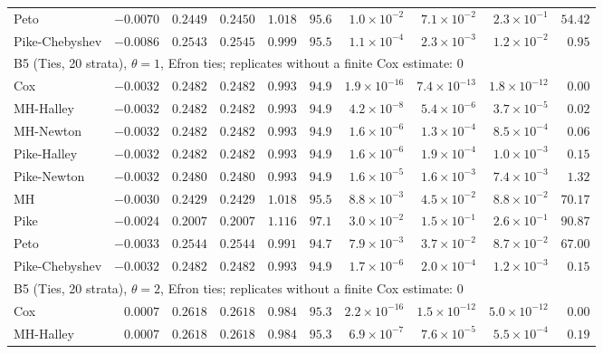 \begin{landscape}
\begin{longtable}{lrrrrrrrrr}
Peto & $-0.0070$ & $0.2449$ & $0.2450$ & $1.018$ & $95.6$ & $1.0 \times 10^{-2}$ & $7.1 \times 10^{-2}$ & $2.3 \times 10^{-1}$ & $54.42$ \\
Pike-Chebyshev & $-0.0086$ & $0.2543$ & $0.2545$ & $0.999$ & $95.5$ & $1.1 \times 10^{-4}$ & $2.3 \times 10^{-3}$ & $1.2 \times 10^{-2}$ & $0.95$ \\
\multicolumn{10}{l}{B5 (Ties, 20 strata), $\theta = 1$, Efron ties; replicates without a finite Cox estimate: 0} \\
Cox & $-0.0032$ & $0.2482$ & $0.2482$ & $0.993$ & $94.9$ & $1.9 \times 10^{-16}$ & $7.4 \times 10^{-13}$ & $1.8 \times 10^{-12}$ & $0.00$ \\
MH-Halley & $-0.0032$ & $0.2482$ & $0.2482$ & $0.993$ & $94.9$ & $4.2 \times 10^{-8}$ & $5.4 \times 10^{-6}$ & $3.7 \times 10^{-5}$ & $0.02$ \\
MH-Newton & $-0.0032$ & $0.2482$ & $0.2482$ & $0.993$ & $94.9$ & $1.6 \times 10^{-6}$ & $1.3 \times 10^{-4}$ & $8.5 \times 10^{-4}$ & $0.06$ \\
Pike-Halley & $-0.0032$ & $0.2482$ & $0.2482$ & $0.993$ & $94.9$ & $1.6 \times 10^{-6}$ & $1.9 \times 10^{-4}$ & $1.0 \times 10^{-3}$ & $0.15$ \\
Pike-Newton & $-0.0032$ & $0.2480$ & $0.2480$ & $0.993$ & $94.9$ & $1.6 \times 10^{-5}$ & $1.6 \times 10^{-3}$ & $7.4 \times 10^{-3}$ & $1.32$ \\
MH & $-0.0030$ & $0.2429$ & $0.2429$ & $1.018$ & $95.5$ & $8.8 \times 10^{-3}$ & $4.5 \times 10^{-2}$ & $8.8 \times 10^{-2}$ & $70.17$ \\
Pike & $-0.0024$ & $0.2007$ & $0.2007$ & $1.116$ & $97.1$ & $3.0 \times 10^{-2}$ & $1.5 \times 10^{-1}$ & $2.6 \times 10^{-1}$ & $90.87$ \\
Peto & $-0.0033$ & $0.2544$ & $0.2544$ & $0.991$ & $94.7$ & $7.9 \times 10^{-3}$ & $3.7 \times 10^{-2}$ & $8.7 \times 10^{-2}$ & $67.00$ \\
Pike-Chebyshev & $-0.0032$ & $0.2482$ & $0.2482$ & $0.993$ & $94.9$ & $1.7 \times 10^{-6}$ & $2.0 \times 10^{-4}$ & $1.2 \times 10^{-3}$ & $0.15$ \\
\multicolumn{10}{l}{B5 (Ties, 20 strata), $\theta = 2$, Efron ties; replicates without a finite Cox estimate: 0} \\
Cox & $0.0007$ & $0.2618$ & $0.2618$ & $0.984$ & $95.3$ & $2.2 \times 10^{-16}$ & $1.5 \times 10^{-12}$ & $5.0 \times 10^{-12}$ & $0.00$ \\
MH-Halley & $0.0007$ & $0.2618$ & $0.2618$ & $0.984$ & $95.3$ & $6.9 \times 10^{-7}$ & $7.6 \times 10^{-5}$ & $5.5 \times 10^{-4}$ & $0.19$ \\

\end{longtable}
\end{landscape}
